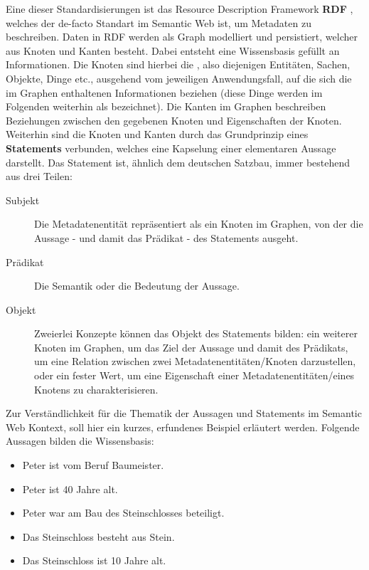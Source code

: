 Eine dieser Standardisierungen ist das Resource Description Framework \textbf{RDF} \cite{Manola-RDFPrimer1.0-2004}, welches der de-facto Standart im Semantic Web ist, um Metadaten zu beschreiben. Daten in RDF werden als Graph modelliert und persistiert, welcher aus Knoten und Kanten besteht. Dabei entsteht eine Wissensbasis gefüllt an Informationen. Die Knoten sind hierbei die , also diejenigen Entitäten, Sachen, Objekte, Dinge etc., ausgehend vom jeweiligen Anwendungsfall, auf die sich die im Graphen enthaltenen Informationen beziehen (diese Dinge werden im Folgenden weiterhin als  bezeichnet). Die Kanten im Graphen beschreiben Beziehungen zwischen den gegebenen Knoten und Eigenschaften der Knoten. Weiterhin sind die Knoten und Kanten durch das Grundprinzip eines \textbf{Statements} verbunden, welches eine Kapselung einer elementaren Aussage darstellt. Das Statement ist, ähnlich dem deutschen Satzbau, immer bestehend aus drei Teilen:

\begin{description}
	\item[Subjekt] Die Metadatenentität repräsentiert als ein Knoten im Graphen, von der die Aussage - und damit das Prädikat - des Statements ausgeht.
	\item[Prädikat] Die Semantik oder die Bedeutung der Aussage.
	\item[Objekt] Zweierlei Konzepte können das Objekt des Statements bilden: ein weiterer Knoten im Graphen, um das Ziel der Aussage und damit des Prädikats, um eine Relation zwischen zwei Metadatenentitäten/Knoten darzustellen, oder ein fester Wert, um eine Eigenschaft einer Metadatenentitäten/eines Knotens zu charakterisieren.
\end{description}

Zur Verständlichkeit für die Thematik der Aussagen und Statements im Semantic Web Kontext, soll hier ein kurzes, erfundenes Beispiel erläutert werden. Folgende Aussagen bilden die Wissensbasis:

\begin{itemize}
	\item Peter ist vom Beruf Baumeister.
	\item Peter ist 40 Jahre alt.
	\item Peter war am Bau des Steinschlosses beteiligt.
	\item Das Steinschloss besteht aus Stein.
	\item Das Steinschloss ist 10 Jahre alt.
\end{itemize}

